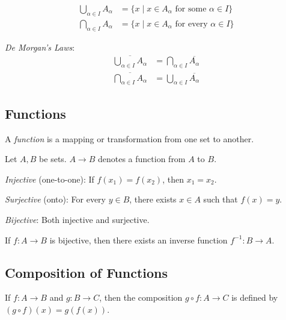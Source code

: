 \documentclass[12pt,a4paper]{article}
\begin{document}
\begin{align*}
\bigcup_{\alpha \in I} A_\alpha &= \{x \mid x \in A_\alpha \text{ for some } \alpha \in I\} \\
\bigcap_{\alpha \in I} A_\alpha &= \{x \mid x \in A_\alpha \text{ for every } \alpha \in I\}
\end{align*}

\textit{De Morgan's Laws}:
\begin{align*}
\overline{\bigcup_{\alpha \in I} A_\alpha} &= \bigcap_{\alpha \in I} \overline{A_\alpha} \\
\overline{\bigcap_{\alpha \in I} A_\alpha} &= \bigcup_{\alpha \in I} \overline{A_\alpha}
\end{align*}

\subsection{Functions}

A \textit{function} is a mapping or transformation from one set to another.

Let $A, B$ be sets. $A \to B$ denotes a function from $A$ to $B$.

\textit{Injective} (one-to-one): If $f(x_1) = f(x_2)$, then $x_1 = x_2$.

\textit{Surjective} (onto): For every $y \in B$, there exists $x \in A$ such that $f(x) = y$.

\textit{Bijective}: Both injective and surjective.

If $f: A \to B$ is bijective, then there exists an inverse function $f^{-1}: B \to A$.

\subsection{Composition of Functions}

If $f: A \to B$ and $g: B \to C$, then the composition $g \circ f: A \to C$ is defined by $(g \circ f)(x) = g(f(x))$.
\end{document}
